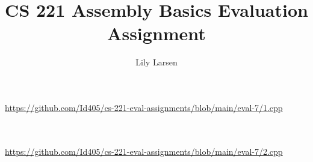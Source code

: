 \documentclass{article}
\title{CS 221 Assembly Basics Evaluation Assignment}
\author{Lily Larsen}
\newcommand{\nicecode}[2]{\inputminted[linenos=true,breaklines,fontsize=\small]{#1}{#2}}
\begin{document}
\maketitle
\newpage

\section{}
\vspace{2ex} \par
\url{https://github.com/Id405/cs-221-eval-assignments/blob/main/eval-7/1.cpp}
\nicecode{cpp}{1.cpp}
\newpage

\section{}
\vspace{2ex} \par
\url{https://github.com/Id405/cs-221-eval-assignments/blob/main/eval-7/2.cpp}
\nicecode{cpp}{2.cpp}
\newpage

\newpage
\end{document}
